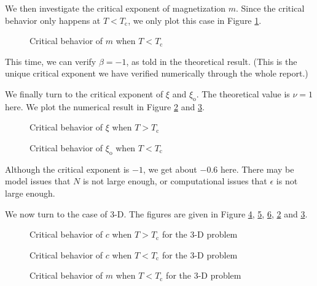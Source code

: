 \documentclass[english, nochinese]{pnote}
\begin{document}
We then investigate the critical exponent of magnetization $m$. Since the critical behavior only happens at $ T < T_{\text{c}} $, we only plot this case in Figure \ref{Fig:CritMagLow}.

\begin{figure}[htbp]
\centering
\scalebox{0.725}{}
\caption{Critical behavior of $m$ when $ T < T_{\text{c}}$}
\label{Fig:CritMagLow}
\end{figure}

This time, we can verify $ \beta = -1 $, as told in the theoretical result. (This is the unique critical exponent we have verified numerically through the whole report.)

We finally turn to the critical exponent of $\xi$ and $\xi_{\text{o}}$. The theoretical value is $ \nu = 1 $ here. We plot the numerical result in Figure \ref{Fig:CritXiHigh} and \ref{Fig:CritXiLow}.

\begin{figure}[htbp]
\centering

\caption{Critical behavior of $\xi$ when $ T > T_{\text{c}}$}
\label{Fig:CritXiHigh}
\end{figure}

\begin{figure}[htbp]
\centering

\caption{Critical behavior of $\xi_{\text{o}}$ when $ T < T_{\text{c}}$}
\label{Fig:CritXiLow}
\end{figure}

Although the critical exponent is $-1$, we get about $-0.6$ here. There may be model issues that $N$ is not large enough, or computational issues that $\epsilon$ is not large enough.

We now turn to the case of 3-D. The figures are given in Figure \ref{Fig:CritAlphaHigh3D}, \ref{Fig:CritAlphaLow3D}, \ref{Fig:CritMagLow3D}, \ref{Fig:CritXiHigh} and \ref{Fig:CritXiLow}.

\begin{figure}[htbp]
\centering
\scalebox{0.725}{}
\caption{Critical behavior of $c$ when $ T > T_{\text{c}}$ for the 3-D problem}
\label{Fig:CritAlphaHigh3D}
\end{figure}

\begin{figure}[htbp]
\centering
\scalebox{0.725}{}
\caption{Critical behavior of $c$ when $ T < T_{\text{c}}$ for the 3-D problem}
\label{Fig:CritAlphaLow3D}
\end{figure}

\begin{figure}[htbp]
\centering
\scalebox{0.725}{}
\caption{Critical behavior of $m$ when $ T < T_{\text{c}}$ for the 3-D problem}
\label{Fig:CritMagLow3D}
\end{figure}
\end{document}
